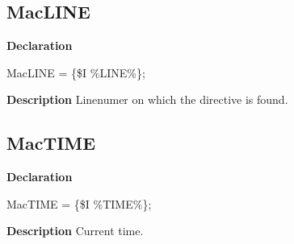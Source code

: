 \documentclass{report}
\begin{document}
\subsection*{MacLINE}
\begin{list}{}{
\setlength{\itemindent}{0cm}
\setlength{\listparindent}{0cm}
\setlength{\leftmargin}{\evensidemargin}
\addtolength{\leftmargin}{\tmplength}
\settowidth{\labelsep}{X}
\addtolength{\leftmargin}{\labelsep}
\setlength{\labelwidth}{\tmplength}
}
\begin{flushleft}
\item[\textbf{Declaration}\hfill]
\begin{ttfamily}
MacLINE = {\{}{\$}I {\%}LINE{\%}{\}};\end{ttfamily}


\end{flushleft}
\par
\item[\textbf{Description}]
Linenumer on which the directive is found.

\end{list}
\subsection*{MacTIME}
\begin{list}{}{
\setlength{\itemindent}{0cm}
\setlength{\listparindent}{0cm}
\setlength{\leftmargin}{\evensidemargin}
\addtolength{\leftmargin}{\tmplength}
\settowidth{\labelsep}{X}
\addtolength{\leftmargin}{\labelsep}
\setlength{\labelwidth}{\tmplength}
}
\begin{flushleft}
\item[\textbf{Declaration}\hfill]
\begin{ttfamily}
MacTIME = {\{}{\$}I {\%}TIME{\%}{\}};\end{ttfamily}


\end{flushleft}
\par
\item[\textbf{Description}]
Current time.

\end{list}
\end{document}

